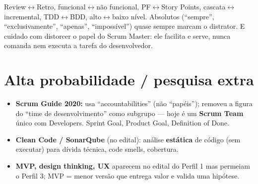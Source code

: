 \begin{pegadinha}
Review$\leftrightarrow$Retro, funcional$\leftrightarrow$não funcional,
PF$\leftrightarrow$Story Points, cascata$\leftrightarrow$incremental,
TDD$\leftrightarrow$BDD, alto$\leftrightarrow$baixo nível. Absolutos
(``sempre'', ``exclusivamente'', ``apenas'', ``impossível'') quase sempre
marcam o distrator. E cuidado com distorcer o papel do Scrum Master: ele
facilita e serve, nunca comanda nem executa a tarefa do desenvolvedor.
\end{pegadinha}

\section{Alta probabilidade / pesquisa extra}

\begin{itemize}
\item \textbf{Scrum Guide 2020:} usa ``accountabilities'' (não ``papéis'');
removeu a figura do ``time de desenvolvimento'' como subgrupo --- hoje é um
\textbf{Scrum Team} único com Developers. Sprint Goal, Product Goal,
Definition of Done.
\item \textbf{Clean Code / SonarQube} (no edital): análise \textbf{estática}
de código (sem executar) para dívida técnica, code smells, cobertura.
\item \textbf{MVP, design thinking, UX} aparecem no edital do Perfil 1 mas
permeiam o Perfil 3; MVP = menor versão que entrega valor e valida uma
hipótese.
\end{itemize}
